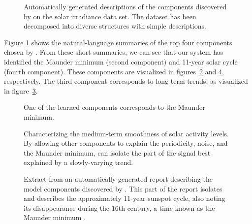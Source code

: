 \begin{figure}[h]
\centering
{}
\caption[Summaries generated by \procedurename{} for the solar irradiance data.]{
Automatically generated descriptions of the components discovered by \procedurename{} on the solar irradiance data set.
The dataset has been decomposed into diverse structures with simple descriptions.}
\label{fig:exec}
\end{figure}
Figure \ref{fig:exec} shows the natural-language summaries of the top four components chosen by \procedurename{}.
From these short summaries, we can see that our system has identified the Maunder minimum (second component) and 11-year solar cycle (fourth component).
These components are visualized in figures~\ref{fig:maunder} and \ref{fig:periodic}, respectively. 
The third component corresponds to long-term trends, as visualized in figure~\ref{fig:smooth}.

\begin{figure}[ht]
\centering
{}
\caption[Automatic identification of the Maunder minimum.]{One of the learned components corresponds to the Maunder minimum.}
\label{fig:maunder}
\end{figure}

\begin{figure}[h!]
\centering
{}
\caption[Characterizing the medium-term smoothness of solar activity levels.]{Characterizing the medium-term smoothness of solar activity levels.  By allowing other components to explain the periodicity, noise, and the Maunder minimum, \procedurename{} can isolate the part of the signal best explained by a slowly-varying trend.}
\label{fig:smooth}
\end{figure}

\begin{figure}[ht]
\centering
{}
\caption[Automatic identification of solar cycles.]{
Extract from an automatically-generated report describing the model components discovered by \procedurename{}.
This part of the report isolates and describes the approximately 11-year sunspot cycle, also noting its disappearance during the 16th century, a time known as the Maunder minimum \citep{Lean1995-vp}.
}
\label{fig:periodic}
\end{figure}

